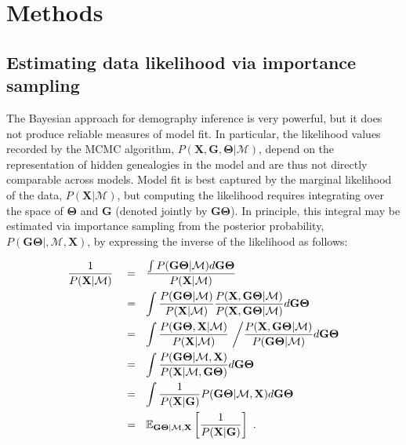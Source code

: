 \documentclass[11pt]{article}
\newcommand{\vect}[1]{\boldsymbol{\mathbf{#1}}}
\newcommand{\E}{\mathbb{E}}
\newcommand{\X}{\vect{X}}
\newcommand{\M}{\mathcal{M}}
\newcommand{\G}{\vect{G}}
\newcommand{\T}{\vect{\Theta}}
\newcommand{\GT}{\G\T}
\begin{document}
%

\section*{Methods}


\subsection*{Estimating data likelihood via importance sampling}

The Bayesian approach for demography inference is very powerful, but it does not produce reliable measures of
model fit.
%
In particular, the likelihood values recorded by the MCMC algorithm, $P(\X,\G,\T|\M)$, depend on the representation of hidden
genealogies in the model and are thus not directly comparable across models.
%
Model fit is best captured by the marginal likelihood of the data, $P(\X|\M)$, but computing the likelihood requires integrating over the space of $\T$ and $\G$
(denoted jointly by $\GT$).
In principle, this integral may be estimated via importance sampling from the posterior
probability, $P(\GT|,\M,\X)$, by expressing the inverse of the likelihood as follows:
%
%
\begin{small}
\begin{align}
\frac{1}{P(\X|\M)} ~~~
&=~~ \frac{\int P(\GT|\M)d\GT}{P(\X|\M)} \notag \\ %
&=~~ \int \frac{P(\GT|\M)}{P(\X|\M)} \frac{P(\X,\GT|\M)}{P(\X,\GT|\M)}  d\GT \notag \\ %
&=~~ \int \frac{P(\GT,\X |\M)}{P(\X|\M)} ~\bigg/ \frac{P(\X,\GT|\M)}{P(\GT|\M)}  d\GT \notag \\ %
&=~~ \int \frac{P(\GT|\M,\X)}{P(\X|\M,\GT)} d\GT \notag \\ %
&=~~ \int \frac{1}{P(\X|\G)}P(\GT|\M,\X) d\GT \notag \\ %
&=~~ \E_{\GT|\M,\X } \left[\frac{1}{P(\X|\G)}\right] ~.\label{eq:is_harmonic}
\end{align}
\end{small}
\end{document}
